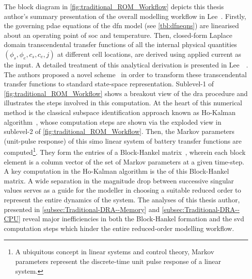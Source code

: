 The   block   diagram   in  \cref{fig:traditional_ROM_Workflow}   depicts   this
thesis  author's   summary  presentation  of  the   overall  modelling  workflow
in   Lee~\etal{}.   Firstly,  the   governing   \gls{pdae}   equations  of   the
\gls{dfn}   model    (see   \cref{tbl:dfneqns})   are   linearised    about   an
operating  point  of  \gls{soc}   and  temperature.  Then,  closed-form  Laplace
domain  transcendental   transfer  functions   of  all  the   internal  physical
quantities~$\left(\phi_{s},\phi_{e},c_{s},c_{e},j\right)$   at  different   cell
locations, are derived using applied current  as the input. A detailed treatment
of  this analytical  derivation is  presented in  Lee~\etal~\cite{Lee2012a}. The
authors  proposed  a novel    scheme~\cite{Lee2012b}  in order  to
transform  these  transcendental  transfer  functions  to  standard  state-space
representation.  Sublevel-1   of  \cref{fig:traditional_ROM_Workflow}   shows  a
breakout view of  the \gls{dra} procedure and illustrates the  steps involved in
this  computation. At  the  heart  of this  numerical  method  is the  classical
subspace  identification approach  known as  Ho-Kalman algorithm~\cite{HO1966a},
whose  computation steps  are  shown  via the  exploded  view  in sublevel-2  of
\cref{fig:traditional_ROM_Workflow}.  Then,  the Markov  parameters  (unit-pulse
response) of  this \gls{simo}  linear system of  battery transfer  functions are
computed\footnote{A  ubiquitous concept  in linear  systems and  control theory,
Markov parameters  represent the discrete-time  unit pulse response of  a linear
system.}.  They  form the  entries  of  a Block-Hankel  matrix~\cite{Ljung1998},
wherein each block  element is a column  vector of the set  of Markov parameters
at  a  given  time-step.  A  key  computation  in  the  Ho-Kalman  algorithm  is
the    of this  Block-Hankel  matrix.  A  wide separation  in  the
magnitude  drop  between  successive  singular  values serves  as  a  guide  for
the  modeller in  choosing  a suitable  reduced order  to  represent the  entire
dynamics  of  the  system.  The   analyses  of  this  thesis  author,  presented
in \cref{subsec:Traditional-DRA--Memory}  and \cref{subsec:Traditional-DRA--CPU}
reveal major inefficiencies in both the Block-Hankel formation and the \gls{svd}
computation steps which hinder the entire reduced-order modelling workflow.

